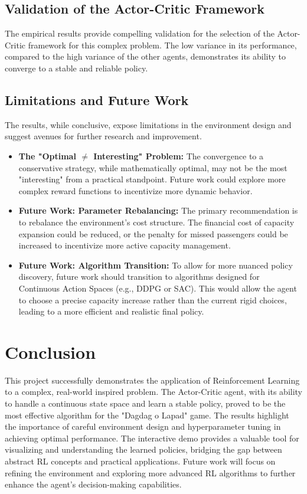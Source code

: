 \documentclass{article}
\begin{document}
\subsection{Validation of the Actor-Critic Framework}

The empirical results provide compelling validation for the selection of the Actor-Critic framework for this complex problem. The low variance in its performance, compared to the high variance of the other agents, demonstrates its ability to converge to a stable and reliable policy.

\subsection{Limitations and Future Work}

The results, while conclusive, expose limitations in the environment design and suggest avenues for further research and improvement.
\begin{itemize}
    \item \textbf{The "Optimal \(\neq\) Interesting" Problem:} The convergence to a conservative strategy, while mathematically optimal, may not be the most "interesting" from a practical standpoint. Future work could explore more complex reward functions to incentivize more dynamic behavior.
    \item \textbf{Future Work: Parameter Rebalancing:} The primary recommendation is to rebalance the environment's cost structure. The financial cost of capacity expansion could be reduced, or the penalty for missed passengers could be increased to incentivize more active capacity management.
    \item \textbf{Future Work: Algorithm Transition:} To allow for more nuanced policy discovery, future work should transition to algorithms designed for Continuous Action Spaces (e.g., DDPG or SAC). This would allow the agent to choose a precise capacity increase rather than the current rigid choices, leading to a more efficient and realistic final policy.
\end{itemize}

\section{Conclusion}

This project successfully demonstrates the application of Reinforcement Learning to a complex, real-world inspired problem. The Actor-Critic agent, with its ability to handle a continuous state space and learn a stable policy, proved to be the most effective algorithm for the "Dagdag o Lapad" game. The results highlight the importance of careful environment design and hyperparameter tuning in achieving optimal performance. The interactive demo provides a valuable tool for visualizing and understanding the learned policies, bridging the gap between abstract RL concepts and practical applications. Future work will focus on refining the environment and exploring more advanced RL algorithms to further enhance the agent's decision-making capabilities.
\end{document}
